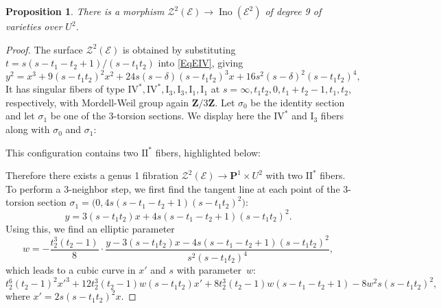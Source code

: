 \documentclass[10pt,a4paper]{amsart}
\newtheorem{prop}{Proposition}
\def\E{\mathcal{E}}
\newcommand{\I}{\mathrm{I}}
\newcommand{\II}{\mathrm{II}}
\newcommand{\IV}{\mathrm{IV}}
\newcommand{\Ino}{\operatorname{{Ino}}}
\def\P{\mathbf{P}}
\newcommand{\Z}{\mathbf{Z}}
\newcommand{\caZ}{{\mathcal Z}}
\begin{document}
\begin{prop} There is a morphism $\caZ^2(\E)\to \Ino(\E^2)$ of degree 9 of varieties over $U^2$.
\end{prop}

\begin{proof} 
The surface $\caZ^2(\E)$ is obtained by substituting $t=s(s-t_1-t_2+1)/(s-t_1t_2)$ into \eqref{EqEIV}, giving
\begin{equation}
\label{eq:base-ch-IV}
y^{2} = x^{3} +9  (s -t_{1} t_{2})^2 x^{2} 
+ 24 s (s - \delta) (s - t_{1} t_{2})^3 x+16 s^2 (s - \delta)^2 (s - t_{1} t_{2})^4,
\end{equation}
It has singular fibers of type $\IV^\ast,\IV^\ast,\I_3,\I_3,\I_1,\I_1$ at $s=\infty,t_1t_2,0,t_1+t_2-1,t_1,t_2$, respectively, with Mordell-Weil group again $\Z/3\Z$.  Let $\sigma_0$ be the identity section and let $\sigma_1$ be one of the 3-torsion sections.   We display here the $\IV^\ast$ and $\I_3$ fibers along with $\sigma_0$ and $\sigma_1$:

\begin{center}

\end{center}



This configuration contains two $\II^\ast$ fibers, highlighted below:
\begin{center}

\end{center}


Therefore there exists a genus 1 fibration $\caZ^2(\E)\to \P^1\times U^2$ with two $\II^{*}$ fibers.  
To perform a $3$-neighbor step, we first find the tangent line at each point of the $3$-torsion section $\sigma_{1}=\bigl(0,4s(s - t_{1} - t_{2} + 1)(s - t_{1}t_{2})^2\bigr)$:
\[
y=3(s-t_{1}t_{2})x + 4s(s - t_{1} - t_{2} + 1)(s-t_{1}t_{2})^2.
\]
Using this, we find an elliptic parameter 
\begin{equation}
\label{paramIV}
w = -\frac{t_{2}^3(t_{2} - 1)}{8}\cdot
\frac{y - 3(s-t_{1}t_{2})x - 4s(s - t_{1} - t_{2} + 1)(s-t_{1}t_{2})^2}{s^2(s-t_{1}t_{2})^4},
\end{equation}
which leads to a cubic curve in $x'$ and $s$ with parameter~$w$:
\begin{equation}
\label{EqIVCubic}
t_{2}^6 (t_{2} - 1)^2 {x'}^3 + 12 t_{2}^3 (t_{2} - 1) w (s -t_{1} t_{2}) x'  + 8 t_{2}^3 (t_{2} - 1) w (s - t_{1} - t_{2} + 1) - 8 w^2 s (s - t_{1} t_{2})^2,
\end{equation}
where $x'=2s(s-t_{1}t_{2})^2 x$.


\end{proof}
\end{document}
